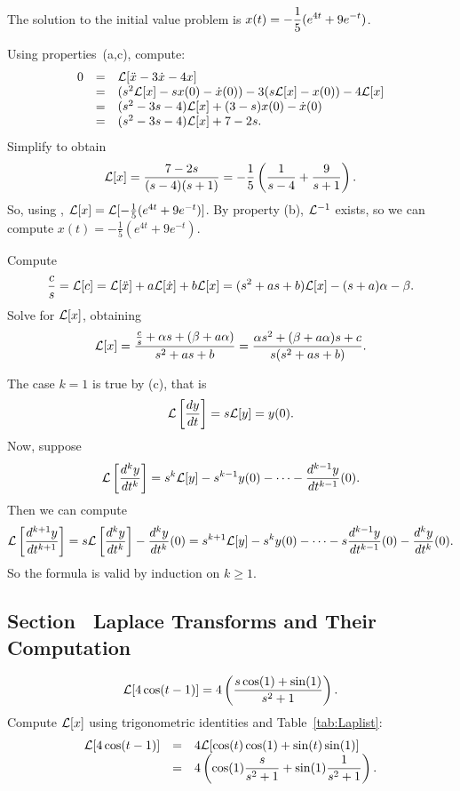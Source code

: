 \documentclass{ximera}
\begin{document}
 \ans The solution to the initial value problem is
$\displaystyle x(t) = -\frac{1}{5}(e^{4t}+9e^{-t})$.

\soln Using properties~(a,c), compute:
\[
\begin{array}{rcl}
0 & = & {\cal L}[\ddot{x} - 3\dot{x} - 4x] \\
& = & (s^2{\cal L}[x] - sx(0) - \dot{x}(0)) - 3(s{\cal L}[x] - x(0))
- 4{\cal L}[x] \\
& = & (s^2 - 3s - 4){\cal L}[x] + (3 - s)x(0) - \dot{x}(0) \\
& = & (s^2 - 3s - 4){\cal L}[x] + 7 - 2s.
\end{array}
\]
Simplify to obtain
\[
{\cal L}[x] = \frac{7-2s}{(s-4)(s+1)} = 
-\frac{1}{5}\left(\frac{1}{s-4} + \frac{9}{s+1}\right).
\]
So, using ,
${\cal L}[x] = {\cal L}[-\frac{1}{5}(e^{4t}+9e^{-t})]$.  By property 
(b), ${\cal L}^{-1}$ exists, so we can compute 
$x(t) = -\frac{1}{5}(e^{4t}+9e^{-t})$.



 Compute
\[
\frac{c}{s} = {\cal L}[c]
= {\cal L}[\ddot{x}] + a{\cal L}[\dot{x}] + b{\cal L}[x]
= (s^2 + as + b){\cal L}[x] - (s + a)\alpha - \beta.
\]
Solve for ${\cal L}[x]$, obtaining
\[
{\cal L}[x]
= \frac{\frac{c}{s} + \alpha s + (\beta + a\alpha)}{s^2 + as + b}
= \frac{\alpha s^2 + (\beta + a\alpha)s + c}{s(s^2 + as + b)}.
\]


 The case $k = 1$ is true by (c), that is
\[
{\cal L}\left[\frac{dy}{dt}\right] = s{\cal L}[y] = y(0).
\]
Now, suppose
\[
{\cal L}\left[\frac{d^ky}{dt^k}\right] = s^k{\cal L}[y] - s^{k - 1}y(0)
- \cdots - \frac{d^{k - 1}y}{dt^{k - 1}}(0).
\]
Then we can compute
\[
{\cal L}\left[\frac{d^{k + 1}y}{dt^{k + 1}}\right] =
s{\cal L}\left[\frac{d^ky}{dt^k}\right] - \frac{d^ky}{dt^k}(0)
= s^{k + 1}{\cal L}[y] - s^{k}y(0)
- \cdots - s\frac{d^{k - 1}y}{dt^{k - 1}}(0) - \frac{d^ky}{dt^k}(0).
\]
So the formula is valid by induction on $k \geq 1$.



\subsection*{Section~\protect{\ref{S:13.3}} Laplace Transforms and Their Computation}


 \ans
\[
{\cal L}[4\cos(t - 1)] =
4\left(\frac{s\cos(1) + \sin(1)}{s^2 + 1}\right).
\]
\soln Compute ${\cal L}[x]$ using trigonometric identities and
Table~\ref{tab:Laplist}:
\[
\begin{array}{rcl}
{\cal L}[4\cos(t - 1)]
& = & 4{\cal L}[\cos(t)\cos(1) + \sin(t)\sin(1)] \\
& = & \displaystyle 4\left(\cos(1)\frac{s}{s^2 + 1} + \sin(1)\frac{1}{s^2 + 1}\right).
\end{array}
\]
\end{document}
